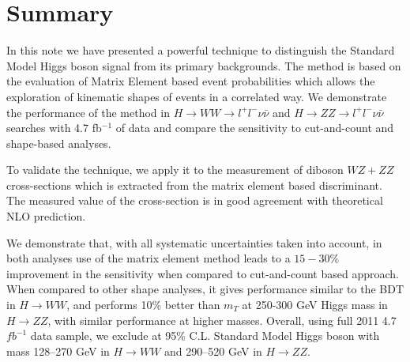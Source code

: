 \documentclass{cmspaper}
\begin{document}
\section{Summary}
In this note we have presented a powerful technique to distinguish the Standard Model Higgs boson signal
from its primary backgrounds. The method is based on the evaluation of Matrix Element based event probabilities 
which allows the exploration of kinematic shapes of events in a correlated way. We demonstrate the
performance of the method in $H \rightarrow WW \rightarrow l^{+}l^{-}\nu\bar{\nu}$ and $H \rightarrow ZZ \rightarrow l^{+}l^{-}\nu\bar{\nu}$ 
searches with 4.7 fb$^{-1}$ of data and compare the sensitivity to cut-and-count and shape-based analyses.  

To validate the technique, we apply it to the measurement of diboson $WZ+ZZ$ cross-sections which is extracted from
the matrix element based discriminant. The measured value of the cross-section is in good agreement with theoretical NLO prediction.

We demonstrate that, with all systematic uncertainties taken into account, in both analyses use of the matrix element method 
leads to a $15-30 \%$ improvement in the sensitivity when compared to cut-and-count based approach. 
When compared to other shape analyses, it gives performance similar to the BDT in $H\rightarrow WW$, and performs 10\% better 
than $m_{T}$ at 250-300 GeV Higgs mass in $H\rightarrow ZZ$, with similar performance at higher masses. 
Overall, using full 2011 4.7 $fb^{-1}$ data sample, we exclude at 95\% C.L. Standard Model Higgs boson with 
mass 128--270 GeV in $H\rightarrow WW$ and 290--520 GeV in $H\rightarrow ZZ$.  

 
\end{document}
